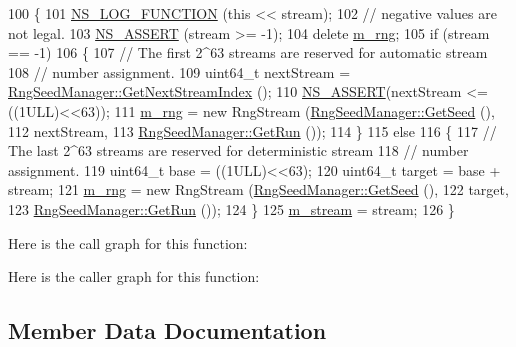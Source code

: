 \begin{DoxyCode}
100 \{
101   \hyperlink{log-macros-disabled_8h_a90b90d5bad1f39cb1b64923ea94c0761}{NS\_LOG\_FUNCTION} (\textcolor{keyword}{this} << stream);
102   \textcolor{comment}{// negative values are not legal.}
103   \hyperlink{assert_8h_a6dccdb0de9b252f60088ce281c49d052}{NS\_ASSERT} (stream >= -1);
104   \textcolor{keyword}{delete} \hyperlink{classns3_1_1RandomVariableStream_ad944ab349eeee833c43ddcc7c749d1fe}{m\_rng};
105   \textcolor{keywordflow}{if} (stream == -1)
106     \{
107       \textcolor{comment}{// The first 2^63 streams are reserved for automatic stream}
108       \textcolor{comment}{// number assignment.}
109       uint64\_t nextStream = \hyperlink{classns3_1_1RngSeedManager_ac109366285260eb4c1e124862d2fd4ad}{RngSeedManager::GetNextStreamIndex} ();
110       \hyperlink{assert_8h_a6dccdb0de9b252f60088ce281c49d052}{NS\_ASSERT}(nextStream <= ((1ULL)<<63));
111       \hyperlink{classns3_1_1RandomVariableStream_ad944ab349eeee833c43ddcc7c749d1fe}{m\_rng} = \textcolor{keyword}{new} RngStream (\hyperlink{classns3_1_1RngSeedManager_a09f2d185f02aac599cd5a244c4b73ba5}{RngSeedManager::GetSeed} (),
112                              nextStream,
113                              \hyperlink{classns3_1_1RngSeedManager_afaf1b845d2523df05ca341a930de24b3}{RngSeedManager::GetRun} ());
114     \}
115   \textcolor{keywordflow}{else}
116     \{
117       \textcolor{comment}{// The last 2^63 streams are reserved for deterministic stream}
118       \textcolor{comment}{// number assignment.}
119       uint64\_t base = ((1ULL)<<63);
120       uint64\_t target = base + stream;
121       \hyperlink{classns3_1_1RandomVariableStream_ad944ab349eeee833c43ddcc7c749d1fe}{m\_rng} = \textcolor{keyword}{new} RngStream (\hyperlink{classns3_1_1RngSeedManager_a09f2d185f02aac599cd5a244c4b73ba5}{RngSeedManager::GetSeed} (),
122                              target,
123                              \hyperlink{classns3_1_1RngSeedManager_afaf1b845d2523df05ca341a930de24b3}{RngSeedManager::GetRun} ());
124     \}
125   \hyperlink{classns3_1_1RandomVariableStream_ab494eafbd56af49c75b504cf5b712ae7}{m\_stream} = stream;
126 \}
\end{DoxyCode}


Here is the call graph for this function\+:




Here is the caller graph for this function\+:




\subsection{Member Data Documentation}
